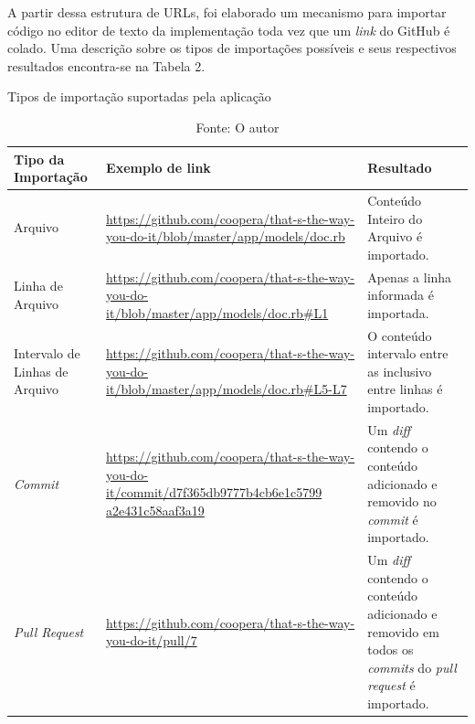 A partir dessa estrutura de URLs, foi elaborado um mecanismo para importar código no editor de texto da implementação toda vez que um \textit{link} do GitHub é colado. Uma descrição sobre os tipos de importações possíveis e seus respectivos resultados encontra-se na Tabela 2.

\begin{table}[]
\centering
    \caption{Tipos de importação suportadas pela aplicação}
    \label{my-label}
    \begin{tabular}{p{3cm} | p{7cm} | p{5cm}}
    \hline
    Tipo da Importação & Exemplo de link & Resultado \\ \hline
    Arquivo & \url{https://github.com/coopera/that-s-the-way-you-do-it/blob/master/app/models/doc.rb} & Conteúdo Inteiro do Arquivo é importado. \\ \hline
    Linha de Arquivo & \url{https://github.com/coopera/that-s-the-way-you-do-it/blob/master/app/models/doc.rb\#L1} & Apenas a linha informada é importada. \\ \hline
    Intervalo de Linhas de Arquivo & \url{https://github.com/coopera/that-s-the-way-you-do-it/blob/master/app/models/doc.rb\#L5-L7} & O conteúdo intervalo entre as inclusivo entre linhas é importado. \\ \hline
    \textit{Commit} & \url{https://github.com/coopera/that-s-the-way-you-do-it/commit/d7f365db9777b4cb6e1c5799}
    \url{a2e431c58aaf3a19} & Um \textit{diff} contendo o conteúdo adicionado e removido no \textit{commit} é importado. \\ \hline
    \textit{Pull Request} & \url{https://github.com/coopera/that-s-the-way-you-do-it/pull/7} & Um \textit{diff} contendo o conteúdo adicionado e removido em todos os \textit{commits} do \textit{pull request} é importado.  \\ \hline
\end{tabular}
\caption*{Fonte: O autor}
\end{table}

